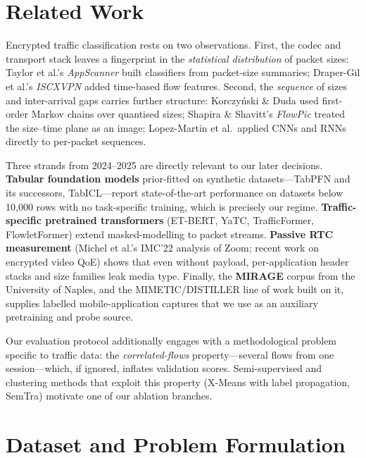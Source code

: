 \documentclass[11pt]{article}
\begin{document}
\section{Related Work}

Encrypted traffic classification rests on two observations. First, the codec and transport stack leaves a
fingerprint in the \emph{statistical distribution} of packet sizes: Taylor et al.'s \emph{AppScanner} built
classifiers from packet-size summaries; Draper-Gil et al.'s \emph{ISCXVPN} added time-based flow features.
Second, the \emph{sequence} of sizes and inter-arrival gaps carries further structure: Korczy\'nski \& Duda
used first-order Markov chains over quantised sizes; Shapira \& Shavitt's \emph{FlowPic} treated the
size--time plane as an image; Lopez-Martin et al.\ applied CNNs and RNNs directly to per-packet sequences.

Three strands from 2024--2025 are directly relevant to our later decisions. \textbf{Tabular foundation
models} prior-fitted on synthetic datasets---TabPFN and its successors, TabICL---report state-of-the-art
performance on datasets below 10{,}000 rows with no task-specific training, which is precisely our regime.
\textbf{Traffic-specific pretrained transformers} (ET-BERT, YaTC, TrafficFormer, FlowletFormer) extend
masked-modelling to packet streams. \textbf{Passive RTC measurement} (Michel et al.'s IMC'22 analysis of
Zoom; recent work on encrypted video QoE) shows that even without payload, per-application header stacks and
size families leak media type. Finally, the \textbf{MIRAGE} corpus from the University of Naples, and the
MIMETIC/DISTILLER line of work built on it, supplies labelled mobile-application captures that we use as an
auxiliary pretraining and probe source.

Our evaluation protocol additionally engages with a methodological problem specific to traffic data: the
\emph{correlated-flows} property---several flows from one session---which, if ignored, inflates validation
scores. Semi-supervised and clustering methods that exploit this property (X-Means with label propagation,
SemTra) motivate one of our ablation branches.

\section{Dataset and Problem Formulation}
\end{document}
